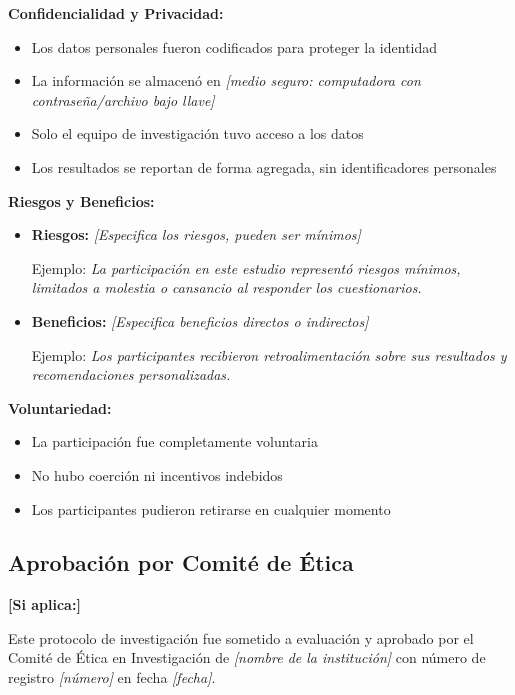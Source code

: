 \textbf{Confidencialidad y Privacidad:}

\begin{itemize}
    \item Los datos personales fueron codificados para proteger la identidad
    \item La información se almacenó en \textit{[medio seguro: computadora con contraseña/archivo bajo llave]}
    \item Solo el equipo de investigación tuvo acceso a los datos
    \item Los resultados se reportan de forma agregada, sin identificadores personales
\end{itemize}

\textbf{Riesgos y Beneficios:}

\begin{itemize}
    \item \textbf{Riesgos:} \textit{[Especifica los riesgos, pueden ser mínimos]}
    
    Ejemplo: \textit{La participación en este estudio representó riesgos mínimos, limitados a molestia o cansancio al responder los cuestionarios.}
    
    \item \textbf{Beneficios:} \textit{[Especifica beneficios directos o indirectos]}
    
    Ejemplo: \textit{Los participantes recibieron retroalimentación sobre sus resultados y recomendaciones personalizadas.}
\end{itemize}

\textbf{Voluntariedad:}

\begin{itemize}
    \item La participación fue completamente voluntaria
    \item No hubo coerción ni incentivos indebidos
    \item Los participantes pudieron retirarse en cualquier momento
\end{itemize}

\subsection{Aprobación por Comité de Ética}
\label{subsec:aprobacion_comite}

\textbf{[Si aplica:]}

Este protocolo de investigación fue sometido a evaluación y aprobado por el Comité de Ética en Investigación de \textit{[nombre de la institución]} con número de registro \textit{[número]} en fecha \textit{[fecha]}.

